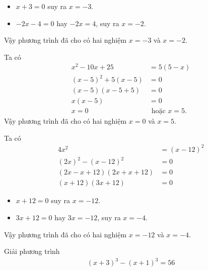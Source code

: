 \begin{bt}
{\begin{listEX}
	\begin{itemize}
	\item $x+3=0$ suy ra $x=-3$.
	\item $-2x-4=0$ hay $-2x=4$, suy ra $x=-2$.
	\end{itemize}	
	Vậy phương trình đã cho có hai nghiệm $x=-3$ và $x=-2$.
	\item Ta có
	$$\begin{aligned} 
	x^2-10 x+25&=5(5-x)\\
	(x-5)^2+5(x-5)&=0 \\ 
	(x-5)(x-5+5)&=0 \\
	x(x-5)&=0	\\
	x=0 &\text { hoặc } x=5.
	\end{aligned}$$
	Vậy phương trình đã cho có hai nghiệm $x=0$ và $x=5$.	
	\item Ta có 
	$$\begin{aligned}
	4 x^2&=(x-12)^2\\
	(2 x)^2-(x-12)^2&=0 \\ 
	(2 x-x+12)(2 x+x+12)&=0 \\ 
	(x+12)(3 x+12)&=0
	\end{aligned}$$
	\begin{itemize}
	\item $x+12=0$ suy ra $x=-12$.
	\item $3x+12=0$ hay $3x=-12$, suy ra $x=-4$.
	\end{itemize}
	Vậy phương trình đã cho có hai nghiệm $x=-12$ và $x=-4$.
	\end{listEX}	}
\end{bt}
\begin{bt}%
	Giải phương trình
	\begin{eqnarray*}
	(x+3)^3-(x+1)^3=56
	\end{eqnarray*}
\end{bt}
